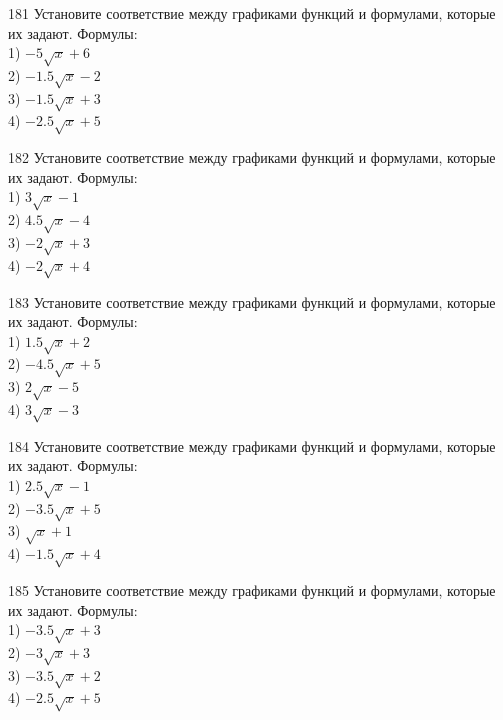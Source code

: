 \documentclass[4apaper]{article}
\begin{document}
\begin{taskBN}{181}
Установите соответствие между графиками функций и формулами, которые их задают. Формулы: \\1) $-5\sqrt{x}+6$\\2) $-1.5\sqrt{x}-2$\\3) $-1.5\sqrt{x}+3$\\4) $-2.5\sqrt{x}+5$
\end{taskBN}

\begin{taskBN}{182}
Установите соответствие между графиками функций и формулами, которые их задают. Формулы: \\1) $3\sqrt{x}-1$\\2) $4.5\sqrt{x}-4$\\3) $-2\sqrt{x}+3$\\4) $-2\sqrt{x}+4$
\end{taskBN}

\begin{taskBN}{183}
Установите соответствие между графиками функций и формулами, которые их задают. Формулы: \\1) $1.5\sqrt{x}+2$\\2) $-4.5\sqrt{x}+5$\\3) $2\sqrt{x}-5$\\4) $3\sqrt{x}-3$
\end{taskBN}

\begin{taskBN}{184}
Установите соответствие между графиками функций и формулами, которые их задают. Формулы: \\1) $2.5\sqrt{x}-1$\\2) $-3.5\sqrt{x}+5$\\3) $\sqrt{x}+1$\\4) $-1.5\sqrt{x}+4$
\end{taskBN}

\begin{taskBN}{185}
Установите соответствие между графиками функций и формулами, которые их задают. Формулы: \\1) $-3.5\sqrt{x}+3$\\2) $-3\sqrt{x}+3$\\3) $-3.5\sqrt{x}+2$\\4) $-2.5\sqrt{x}+5$
\end{taskBN}
\end{document}
